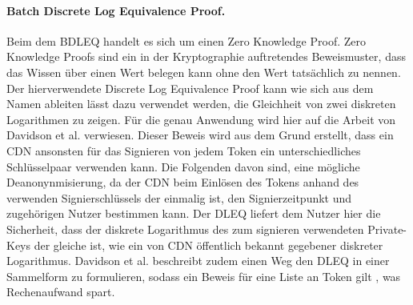 \documentclass[
	fontsize=12pt,
	headings=small,
	parskip=half,           %
	bibliography=totoc,
	numbers=noenddot,       %
	open=any,               %
]{scrreprt}
\begin{document}
\paragraph{Batch Discrete Log Equivalence Proof.}
Beim dem BDLEQ handelt es sich um einen Zero Knowledge Proof. Zero Knowledge Proofs sind ein in der Kryptographie auftretendes Beweismuster, dass das Wissen über einen Wert belegen kann ohne den Wert tatsächlich zu nennen. Der hierverwendete Discrete Log Equivalence Proof kann wie sich aus dem Namen ableiten lässt dazu verwendet werden, die Gleichheit von zwei diskreten Logarithmen zu zeigen. Für die genau Anwendung wird hier auf die Arbeit von Davidson et al. \cite{pp-davidson2018privacy} verwiesen. Dieser Beweis wird aus dem Grund erstellt, dass ein CDN ansonsten für das Signieren von jedem Token ein unterschiedliches Schlüsselpaar verwenden kann. Die Folgenden davon sind, eine mögliche Deanonynmisierung, da der CDN beim Einlösen des Tokens anhand des verwenden Signierschlüssels der einmalig ist, den Signierzeitpunkt und zugehörigen Nutzer bestimmen kann. Der DLEQ liefert dem Nutzer hier die Sicherheit, dass der diskrete Logarithmus des zum signieren verwendeten Private-Keys der gleiche ist, wie ein von CDN öffentlich bekannt gegebener diskreter Logarithmus. Davidson et al. beschreibt zudem einen Weg den DLEQ in einer Sammelform zu formulieren, sodass ein Beweis für eine Liste an Token gilt \cite{pp-davidson2018privacy}, was Rechenaufwand spart.\\\\
\end{document}
